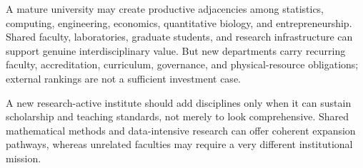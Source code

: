 A mature university may create productive adjacencies among statistics, computing, engineering, economics, quantitative biology, and entrepreneurship. Shared faculty, laboratories, graduate students, and research infrastructure can support genuine interdisciplinary value. But new departments carry recurring faculty, accreditation, curriculum, governance, and physical-resource obligations; external rankings are not a sufficient investment case.

A new research-active institute should add disciplines only when it can sustain scholarship and teaching standards, not merely to look comprehensive. Shared mathematical methods and data-intensive research can offer coherent expansion pathways, whereas unrelated faculties may require a very different institutional mission.
